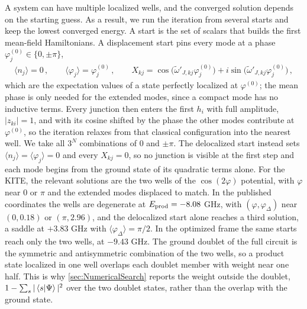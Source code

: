 A system can have multiple localized wells, and the converged solution depends on the starting guess.
As a result, we run the iteration from several starts and keep the lowest converged energy.
A start is the set of scalars that builds the first mean-field Hamiltonians.
A displacement start pins every mode at a phase $\varphi_j^{(0)}\in\{0,\pm\pi\}$,
\begin{align}
    \langle n_j\rangle=0\, ,\qquad
    \langle\varphi_j\rangle=\varphi_j^{(0)}\, ,\qquad
    X_{kj}=\cos\bigl(\tilde\omega'_{J,kj}\varphi_j^{(0)}\bigr)+i\sin\bigl(\tilde\omega'_{J,kj}\varphi_j^{(0)}\bigr)\, ,
    \label{eq:start}
\end{align}
which are the expectation values of a state perfectly localized at $\varphi^{(0)}$; the mean phase is only needed for the extended modes, since a compact mode has no inductive terms.
Every junction then enters the first $h_i$ with full amplitude, $|z_{ki}|=1$, and with its cosine shifted by the phase the other modes contribute at $\varphi^{(0)}$, so the iteration relaxes from that classical configuration into the nearest well.
We take all $3^N$ combinations of $0$ and $\pm\pi$.
The delocalized start instead sets $\langle n_j\rangle=\langle\varphi_j\rangle=0$ and every $X_{kj}=0$, so no junction is visible at the first step and each mode begins from the ground state of its quadratic terms alone.
For the KITE, the relevant solutions are the two wells of the $\cos(2\varphi)$ potential, with $\varphi$ near $0$ or $\pi$ and the extended modes displaced to match.
In the published coordinates the wells are degenerate at $E_{\rm prod}=-8.08$ GHz, with $(\varphi,\varphi_\Delta)$ near $(0,0.18)$ or $(\pi,2.96)$, and the delocalized start alone reaches a third solution, a saddle at $+3.83$ GHz with $\langle\varphi_\Delta\rangle=\pi/2$.
In the optimized frame the same starts reach only the two wells, at $-9.43$ GHz.
The ground doublet of the full circuit is the symmetric and antisymmetric combination of the two wells, so a product state localized in one well overlaps each doublet member with weight near one half.
This is why \cref{sec:NumericalSearch} reports the weight outside the doublet, $1-\sum_s|\braket{s|\Psi}|^2$ over the two doublet states, rather than the overlap with the ground state.

